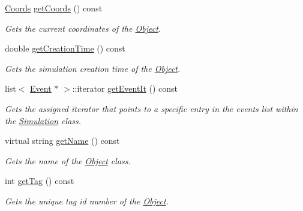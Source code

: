 \begin{DoxyCompactItemize}
\mbox{\label{class_object_a08df08943dc634609fa69b356a37d73f}} 
\hyperlink{struct_coords}{Coords} \hyperlink{class_object_a08df08943dc634609fa69b356a37d73f}{get\+Coords} () const
\begin{DoxyCompactList}\small\item\em Gets the current coordinates of the \hyperlink{class_object}{Object}. \end{DoxyCompactList}\item 
\mbox{\label{class_object_a6f91c3f8b61cb9c9a8db662ac07d92e9}} 
double \hyperlink{class_object_a6f91c3f8b61cb9c9a8db662ac07d92e9}{get\+Creation\+Time} () const
\begin{DoxyCompactList}\small\item\em Gets the simulation creation time of the \hyperlink{class_object}{Object}. \end{DoxyCompactList}\item 
\mbox{\label{class_object_aa7c58e0319b7715c8d36f38ca7acf03e}} 
list$<$ \hyperlink{class_event}{Event} $\ast$ $>$\+::iterator \hyperlink{class_object_aa7c58e0319b7715c8d36f38ca7acf03e}{get\+Event\+It} () const
\begin{DoxyCompactList}\small\item\em Gets the assigned iterator that points to a specific entry in the events list within the \hyperlink{class_simulation}{Simulation} class. \end{DoxyCompactList}\item 
virtual string \hyperlink{class_object_ade517616d51cd9ab581ec5afeb37b313}{get\+Name} () const
\begin{DoxyCompactList}\small\item\em Gets the name of the \hyperlink{class_object}{Object} class. \end{DoxyCompactList}\item 
\mbox{\label{class_object_aa9653577e8d0ac4b7b86d23d12f8b31b}} 
int \hyperlink{class_object_aa9653577e8d0ac4b7b86d23d12f8b31b}{get\+Tag} () const
\begin{DoxyCompactList}\small\item\em Gets the unique tag id number of the \hyperlink{class_object}{Object}. \end{DoxyCompactList}\item 
\mbox{\label{class_object_a3d7c877f4aa179d9a56050c5faddc18d}} 

\end{DoxyCompactItemize}
